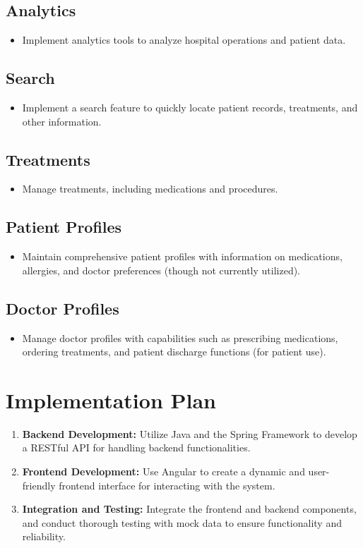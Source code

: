 \documentclass{article}
\begin{document}
\subsection{Analytics}
\begin{itemize}
    \item Implement analytics tools to analyze hospital operations and patient data.
\end{itemize}

\subsection{Search}
\begin{itemize}
    \item Implement a search feature to quickly locate patient records, treatments, and other information.
\end{itemize}

\subsection{Treatments}
\begin{itemize}
    \item Manage treatments, including medications and procedures.
\end{itemize}

\subsection{Patient Profiles}
\begin{itemize}
    \item Maintain comprehensive patient profiles with information on medications, allergies, and doctor preferences (though not currently utilized).
\end{itemize}

\subsection{Doctor Profiles}
\begin{itemize}
    \item Manage doctor profiles with capabilities such as prescribing medications, ordering treatments, and patient discharge functions (for patient use).
\end{itemize}

\section{Implementation Plan}
\begin{enumerate}
    \item \textbf{Backend Development:} Utilize Java and the Spring Framework to develop a RESTful API for handling backend functionalities.
    \item \textbf{Frontend Development:} Use Angular to create a dynamic and user-friendly frontend interface for interacting with the system.
    \item \textbf{Integration and Testing:} Integrate the frontend and backend components, and conduct thorough testing with mock data to ensure functionality and reliability.
\end{enumerate}
\end{document}

